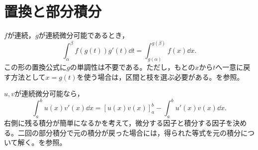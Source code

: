 \section{置換と部分積分}
$f$が連続，$g$が連続微分可能であるとき，
\[
 \int_\alpha^\beta f(g(t))g'(t)\dd t
 =\int_{g(\alpha)}^{g(\beta)}f(x)\dd x.
\]
この形の置換公式に$g$の単調性は不要である。ただし，もとの$x$から$t$へ一意に戻す方法として$x=g(t)$を使う場合は，区間と枝を選ぶ必要がある。を参照。

$u,v$が連続微分可能なら，
\[
 \int_a^b u(x)v'(x)\dd x
 =[u(x)v(x)]_a^b-\int_a^b u'(x)v(x)\dd x.
\]
右側に残る積分が簡単になるかを考えて，微分する因子と積分する因子を決める。二回の部分積分で元の積分が戻った場合には，得られた等式を元の積分について解く。を参照。

